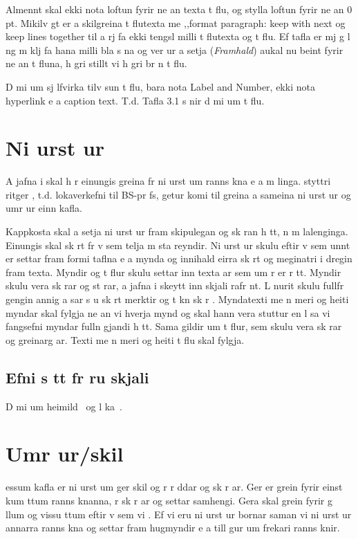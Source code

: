 \documentclass{article}
\begin{document}
Almennt skal ekki nota loftun fyrir ne an texta   t flu, og stylla loftun fyrir ne an   0 pt.
Mikilv gt er a  skilgreina t flutexta me  ,,format paragraph: keep with next og keep lines together  til a  rj fa ekki tengsl   milli t flutexta og t flu. Ef tafla er mj g l ng m  klj fa hana   milli bla s na og   ver ur a  setja (\textit{Framhald})   aukal nu beint fyrir ne an t fluna, h gri stillt vi  h gri br n t flu.

D mi um sj lfvirka tilv sun   t flu, bara nota Label and Number, ekki nota hyperlink e a caption text. T.d. Tafla 3.1 s nir d mi um t flu.

\chapter{Ni urst ur}
A  jafna i skal h r einungis greina fr  ni urst um ranns kna e a m linga.   styttri ritger , t.d. lokaverkefni til BS-pr fs, getur komi  til greina a  sameina ni urst ur og umr ur   einn kafla.

Kappkosta  skal a  setja ni urst ur fram   skipulegan og sk ran h tt,  n m lalenginga. Einungis skal sk rt fr   v  sem telja m  sta reyndir. Ni urst ur skulu eftir  v  sem unnt er settar fram   formi taflna e a mynda og innihald  eirra sk rt og meginatri i dregin fram   texta. Myndir og t flur skulu settar inn   texta  ar sem um  r er r tt. Myndir skulu vera sk rar og st rar, a  jafna i skeytt inn   skjali  rafr nt. L nurit skulu fullfr gengin  annig a   sar s u sk rt merktir og t kn sk r . Myndatexti me  n meri og heiti myndar skal fylgja ne an vi  hverja mynd og skal hann vera stuttur en   l sa vi fangsefni myndar   fulln gjandi h tt. Sama gildir um t flur, sem skulu vera sk rar og greinarg ar. Texti me  n meri og heiti t flu skal fylgja.

\section{Efni s tt fr   ru skjali}
D mi um heimild~\cite{dirac} og l ka~\cite{einstein}.


\chapter{Umr ur/skil}
   essum kafla er ni urst um ger  skil og  r r ddar og sk r ar. Ger  er grein fyrir einst kum  ttum ranns knanna,  r sk r ar og settar   samhengi. Gera skal grein fyrir  g llum og  vissu ttum eftir  v  sem vi   . Ef vi    eru ni urst ur bornar saman vi  ni urst ur annarra ranns kna og settar fram hugmyndir e a till gur um frekari ranns knir.
\end{document}
